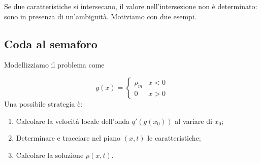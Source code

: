 \documentclass[10pt,a4paper,twoside,openright]{book}
\begin{document}
Se due caratteristiche si intersecano, il valore nell'intersezione non è determinato: sono in presenza di un'ambiguità. Motiviamo con due esempi.
\subsection{Coda al semaforo}

Modellizziamo il problema come


\begin{equation*}
	g( x) =
	\begin{cases}
		\rho _{m} & x< 0 \\
		0         & x >0 
	\end{cases}
\end{equation*}
Una possibile strategia è:
\begin{enumerate}
	\item Calcolare la velocità locale dell'onda $q'( g( x_{0}))$ al variare di $x_{0}$;
	\item Determinare e tracciare nel piano $( x,t)$ le caratteristiche;
	\item Calcolare la soluzione $\rho ( x,t)$.
\end{enumerate}
\end{document}
